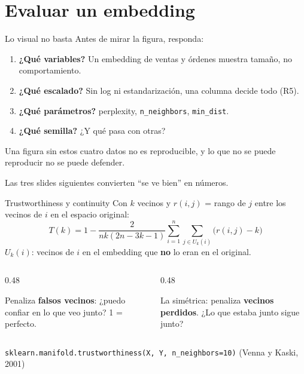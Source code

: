 \documentclass[aspectratio=169,12pt]{beamer}
\begin{document}
\section{Evaluar un embedding}

\begin{frame}{Lo visual no basta}
  \small Antes de mirar la figura, responda:
  \begin{enumerate}
    \item \textbf{¿Qué variables?} Un embedding de ventas y órdenes muestra tamaño, no comportamiento.
    \item \textbf{¿Qué escalado?} Sin log ni estandarización, una columna decide todo (R5).
    \item \textbf{¿Qué parámetros?} perplexity, \texttt{n\_neighbors}, \texttt{min\_dist}.
    \item \textbf{¿Qué semilla?} ¿Y qué pasa con otras?
  \end{enumerate}
  \begin{rulebox}
    \small Una figura sin estos cuatro datos no es reproducible, y lo que no se puede reproducir no se puede defender.
  \end{rulebox}
  \small Las tres slides siguientes convierten ``se ve bien'' en números.
\end{frame}

\begin{frame}{Trustworthiness y continuity}
  \small Con $k$ vecinos y $r(i,j)$ = rango de $j$ entre los vecinos de $i$ en el espacio original:
  \[ T(k) = 1 - \frac{2}{nk(2n-3k-1)} \sum_{i=1}^{n} \sum_{j \in U_k(i)} \bigl(r(i,j) - k\bigr) \]
  {\footnotesize $U_k(i)$: vecinos de $i$ en el embedding que \textbf{no} lo eran en el original.}
  \begin{columns}[T]
    \begin{column}{0.48\textwidth}
      \begin{defbox}[Trustworthiness]
        \small Penaliza \textbf{falsos vecinos}: ¿puedo confiar en lo que veo junto? 1 = perfecto.
      \end{defbox}
    \end{column}
    \begin{column}{0.48\textwidth}
      \begin{defbox}[Continuity]
        \small La simétrica: penaliza \textbf{vecinos perdidos}. ¿Lo que estaba junto sigue junto?
      \end{defbox}
    \end{column}
  \end{columns}
  \footnotesize \texttt{sklearn.manifold.trustworthiness(X, Y, n\_neighbors=10)} \quad (Venna y Kaski, 2001)
\end{frame}
\end{document}
